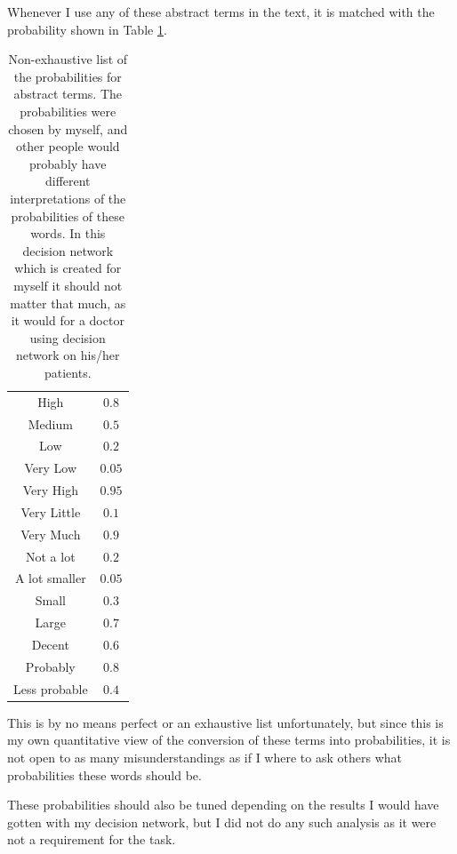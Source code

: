\documentclass[11pt, a4paper, english]{../Template/NTNUoving}
\begin{document}
\begin{oppgave}
    Whenever I use any of these abstract terms in the text, it is matched with the probability shown
    in Table \ref{tab:prob}.

    \begin{table}[H]
        \centering
        \begin{tabular}{|c|c|}
            \hline
            High & $0.8$   \\ [1.0ex]
            Medium & $0.5$   \\ [1.0ex]
            Low & $0.2$   \\ [1.0ex]
            Very Low & $0.05$   \\ [1.0ex]
            Very High & $0.95$   \\ [1.0ex]
            Very Little & $0.1$   \\ [1.0ex]
            Very Much & $0.9$   \\ [1.0ex]
            Not a lot & $0.2$   \\ [1.0ex]
            A lot smaller & $0.05$   \\ [1.0ex]
            Small & $0.3$   \\ [1.0ex]
            Large & $0.7$   \\ [1.0ex]
            Decent & $0.6$   \\ [1.0ex]
            Probably & $0.8$   \\ [1.0ex]
            Less probable & $0.4$   \\ [1.0ex]
            \hline
    \end{tabular}
        \caption{Non-exhaustive list of the probabilities for abstract terms. The probabilities were chosen
        by myself, and other people would probably have different interpretations of the probabilities of these words. In this decision network
        which is created for myself it should not matter that much, as it would for a doctor using decision network on his/her patients.}
        \label{tab:prob}
    \end{table}

    This is by no means perfect or an exhaustive list unfortunately, but since this is my own quantitative view of the conversion of these terms into
    probabilities, it is not open to as many misunderstandings as if I where to ask others what probabilities these words should be.

    These probabilities should also be tuned depending on the results I would have gotten with my decision network,
    but I did not do any such analysis as it were not a requirement for the task.


\end{oppgave}
\end{document}
